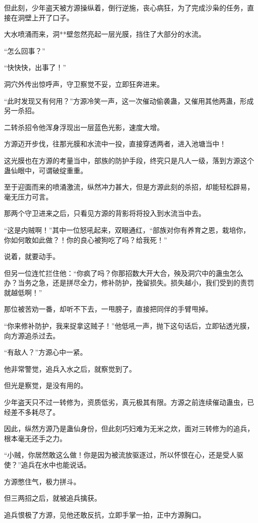 \begin{this_body}
但此刻，少年盗天被方源操纵着，倒行逆施，丧心病狂，为了完成沙枭的任务，直接在洞壁上开了口子。

大水喷涌而来，洞**壁忽然亮起一层光膜，挡住了大部分的水流。

“怎么回事？”

“快快快，出事了！”

洞穴外传出惊呼声，守卫察觉不妥，立即狂奔进来。

“此时发现又有何用？”方源冷笑一声，这一次催动偷袭蛊，又催用其他两蛊，形成另一杀招。

二转杀招令他浑身浮现出一层蓝色光影，速度大增。

方源迈开步伐，往那光膜和水流中一投，直接穿透两者，进入池塘当中！

这光膜也在方源的考量当中，部族的防护手段，终究只是凡人一级，落到方源这个蛊仙眼中，可谓破绽重重。

至于迎面而来的喷涌激流，纵然冲力甚大，但是方源此刻的杀招，却能轻松辟易，毫无压力可言。

那两个守卫进来之后，只看见方源的背影将将投入到水流当中去。

“这是内贼啊！”其中一位怒吼起来，双眼通红，“部族对你有养育之恩，栽培你，你如何敢如此做？！你的良心被狗吃了吗？给我死！”

说着，就要动手。

但另一位连忙拦住他：“你疯了吗？你那招数大开大合，殃及洞穴中的蛊虫怎么办？当务之急，还是拼尽全力，修补防护，挽留损失。损失越小，我们受到的责罚就越低啊！”

那位被苦劝一番，却听不下去，一甩膀子，直接把同伴的手臂甩掉。

“你来修补防护，我来捉拿这贼子！”他低吼一声，抛下这句话后，立即钻透光膜，向方源追杀过去。

“有敌人？”方源心中一紧。

他非常警觉，追兵入水之后，就察觉到了。

但光是察觉，是没有用的。

少年盗天只不过一转修为，资质低劣，真元极其有限。方源之前连续催动蛊虫，已经差不多耗尽了。

因此，纵然方源乃是蛊仙身份，但此刻巧妇难为无米之炊，面对三转修为的追兵，根本毫无还手之力。

“小贼，你居然敢这么做！你是因为被流放驱逐过，所以怀恨在心，还是受人驱使？”追兵在水中也能说话。

方源憋住气，极力拼斗。

但三两招之后，就被追兵擒获。

追兵恨极了方源，见他还敢反抗，立即手掌一拍，正中方源胸口。


\end{this_body}
